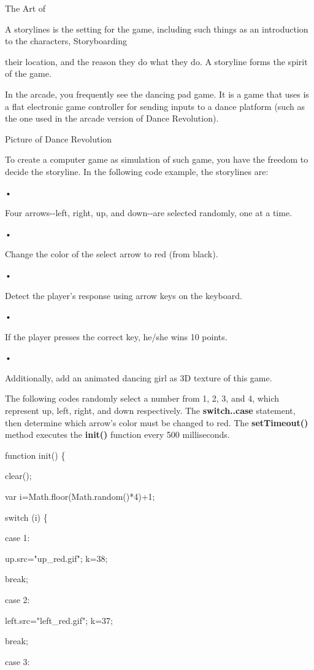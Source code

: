 \documentclass[
]{article}
\begin{document}
The Art of

A storylines is the setting for the game, including such things as an
introduction to the characters, Storyboarding

their location, and the reason they do what they do. A storyline forms
the spirit of the game.

In the arcade, you frequently see the dancing pad game. It is a game
that uses is a flat electronic game controller for sending inputs to a
dance platform (such as the one used in the arcade version of Dance
Revolution).

Picture of Dance Revolution

To create a computer game as simulation of such game, you have the
freedom to decide the storyline. In the following code example, the
storylines are:

•

Four arrows-\/-left, right, up, and down-\/-are selected randomly, one
at a time.

•

Change the color of the select arrow to red (from black).

•

Detect the player's response using arrow keys on the keyboard.

•

If the player presses the correct key, he/she wins 10 points.

•

Additionally, add an animated dancing girl as 3D texture of this game.

The following codes randomly select a number from 1, 2, 3, and 4, which
represent up, left, right, and down respectively. The
\textbf{switch..case} statement, then determine which arrow's color must
be changed to red. The \textbf{setTimeout()} method executes the
\textbf{init()} function every 500 milliseconds.

function init() \{

clear();

var i=Math.floor(Math.random()*4)+1;

switch (i) \{

case 1:

up.src="up\_red.gif"; k=38;

break;

case 2:

left.src="left\_red.gif"; k=37;

break;

case 3:
\end{document}
